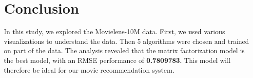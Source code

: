 \documentclass[
]{article}
\begin{document}
\section{Conclusion}\label{conclusion}

In this study, we explored the Movielens-10M data. First, we used various visualizations to understand the data. Then 5 algorithms were chosen and trained on part of the data. The analysis revealed that the matrix factorization model is the best model, with an RMSE performance of \textbf{0.7809783}. This model will therefore be ideal for our movie recommendation system.
\end{document}
